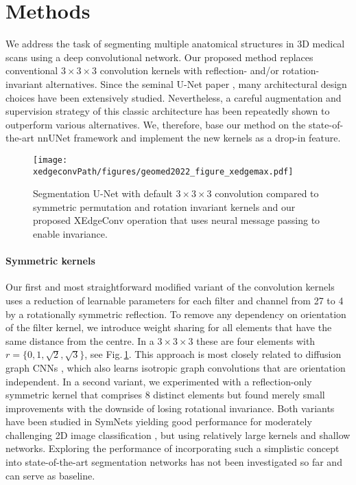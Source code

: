 \section{Methods}
    We address the task of segmenting multiple anatomical structures in 3D medical scans using a deep convolutional network. Our proposed method replaces conventional $3\times3\times3$ convolution kernels with reflection- and/or rotation-invariant alternatives. Since the seminal U-Net paper \cite{ronneberger2015u}, many architectural design choices have been extensively studied. Nevertheless, a careful augmentation and supervision strategy of this classic architecture has been repeatedly shown to outperform various alternatives. We, therefore, base our method on the state-of-the-art nnUNet framework \cite{isensee2021nnu} and implement the new kernels as a drop-in feature.

    \begin{figure}
        \caption{
            Segmentation U-Net with default $3\times3\times3$  convolution compared to symmetric permutation and rotation invariant kernels  and our proposed XEdgeConv operation that uses neural message passing to enable invariance.
        }
        \label{fig:concept}
        \texttt{[image: \\xedgeconvPath/figures/geomed2022\_figure\_xedgemax.pdf]}
    \end{figure}
    \paragraph{Symmetric kernels} Our first and most straightforward modified variant of the convolution kernels  uses a reduction of learnable parameters for each filter and channel from 27 to 4 by a rotationally symmetric reflection. To remove any dependency on orientation of the filter kernel, we introduce weight sharing for all elements that have the same distance from the centre. In a $3\times3\times3$ these are four elements with $r=\{0,1,\sqrt{2},\sqrt{3}\}$, see Fig.\,\ref{fig:concept}. This approach is most closely related to diffusion graph CNNs \cite{atwood2016diffusion}, which also learns isotropic graph convolutions that are orientation independent. In a second variant, we experimented with a reflection-only symmetric kernel that comprises 8 distinct elements but found merely small improvements with the downside of losing rotational invariance. Both variants have been studied in SymNets yielding good performance for moderately challenging 2D image classification \cite{dzhezyan2021symmetrical}, but using relatively large kernels and shallow networks.
    Exploring the performance of incorporating such a simplistic concept into state-of-the-art segmentation networks has not been investigated so far and can serve as baseline.


